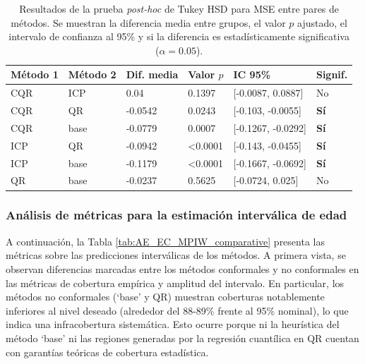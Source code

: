 \renewcommand{\arraystretch}{1.2}
\begin{table}[htbp]
    \small
    \centering
    \begin{tabular}{llllll}
    \toprule
    \textbf{Método 1} & \textbf{Método 2} & \textbf{Dif. media} & \textbf{Valor $p$} & \textbf{IC 95\%} & \textbf{Signif.} \\ \hline
    CQR & ICP & 0.04 & 0.1397 & [-0.0087, 0.0887] & No \\
    CQR & QR & -0.0542 & 0.0243 & [-0.103, -0.0055] & \textbf{Sí} \\
    CQR & base & -0.0779 & 0.0007 & [-0.1267, -0.0292] & \textbf{Sí} \\
    ICP & QR & -0.0942 & \textless 0.0001 & [-0.143, -0.0455] & \textbf{Sí} \\
    ICP & base & -0.1179 & \textless 0.0001 & [-0.1667, -0.0692] & \textbf{Sí} \\
    QR & base & -0.0237 & 0.5625 & [-0.0724, 0.025] & No \\
    \bottomrule
    \end{tabular}
    \caption[
        Resultados de la prueba \textit{post-hoc} de Tukey HSD para MSE entre pares de métodos.
    ]{
        Resultados de la prueba \textit{post-hoc} de Tukey HSD para MSE entre pares de métodos.
        Se muestran la diferencia media entre grupos, el valor $p$ ajustado, el intervalo de confianza al 95\% y si la diferencia es estadísticamente significativa ($\alpha = 0.05$).
    }
    \label{tab:AE_tukey_mse}
\end{table}


\subsubsection{Análisis de métricas para la estimación interválica de edad}

A continuación, la Tabla \ref{tab:AE_EC_MPIW_comparative} presenta las métricas sobre las predicciones interválicas de los métodos. A primera vista, se observan diferencias marcadas entre los métodos conformales y no conformales en las métricas de cobertura empírica y amplitud del intervalo. En particular, los métodos no conformales (`base' y QR) muestran coberturas notablemente inferiores al nivel deseado (alrededor del 88-89\% frente al 95\% nominal), lo que indica una infracobertura sistemática. Esto ocurre porque ni la heurística del método `base' ni las regiones generadas por la regresión cuantílica en QR cuentan con garantías teóricas de cobertura estadística.

